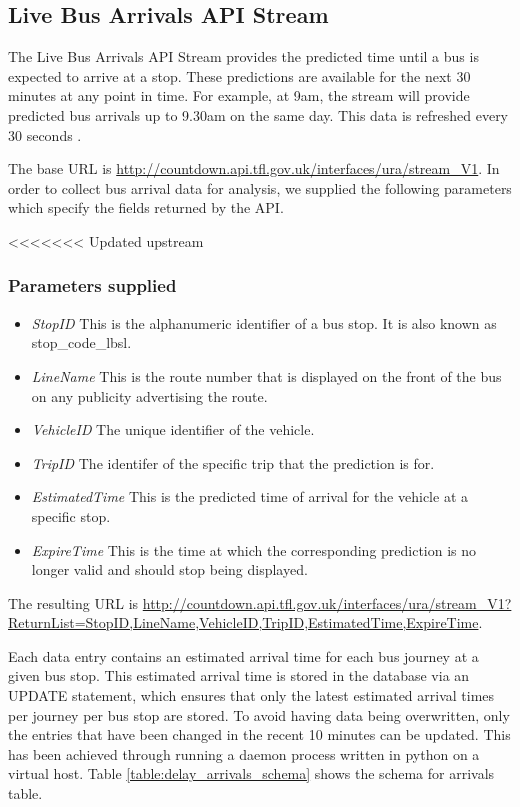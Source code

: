 \subsection{Live Bus Arrivals API Stream}
\par The Live Bus Arrivals API Stream provides the predicted time until a bus is expected to arrive at a stop. These predictions are available for the next 30 minutes at any point in time. For example, at 9am, the stream will provide predicted bus arrivals up to 9.30am on the same day. This data is refreshed every 30 seconds \cite{live_bus_api_documentation}.

\par The base URL is \url{http://countdown.api.tfl.gov.uk/interfaces/ura/stream_V1}. In order to collect bus arrival data for analysis, we supplied the following parameters which specify the fields returned by the API.

<<<<<<< Updated upstream
\subsubsection{Parameters supplied}
\begin{itemize}
	\item \textit{StopID} This is the alphanumeric identifier of a bus stop. It is also known as stop\_code\_lbsl.
 	\item \textit{LineName} This is the route number that is displayed on the front of the bus on any publicity advertising the route.
  \item \textit{VehicleID} The unique identifier of the vehicle.
  \item \textit{TripID} The identifer of the specific trip that the prediction is for.
  \item \textit{EstimatedTime} This is the predicted time of arrival for the vehicle at a specific stop.
  \item \textit{ExpireTime} This is the time at which the corresponding prediction is no longer valid and should stop being displayed.
\end{itemize}

\par The resulting URL is \sloppy \url{http://countdown.api.tfl.gov.uk/interfaces/ura/stream_V1?ReturnList=StopID,LineName,VehicleID,TripID,EstimatedTime,ExpireTime}.

\par Each data entry contains an estimated arrival time for each bus journey at a given bus stop. This estimated arrival time is stored in the database via an UPDATE statement, which ensures that only the latest estimated arrival times per journey per bus stop are stored. To avoid having data being overwritten, only the entries that have been changed in the recent 10 minutes can be updated. This has been achieved through running a daemon process written in python on a virtual host. Table \ref{table:delay_arrivals_schema} shows the schema for arrivals table.

